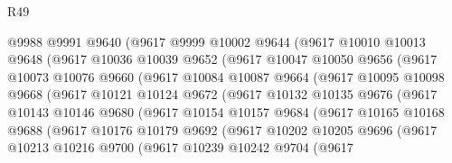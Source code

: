 \begin{lexlean}{R49}
\begin{coremodule}
                @9988
                @9991
                @9640
                (@9617
                  @9999
                  @10002
                  @9644
                  (@9617
                    @10010
                    @10013
                    @9648
                    (@9617
                      @10036
                      @10039
                      @9652
                      (@9617
                        @10047
                        @10050
                        @9656
                        (@9617
                          @10073
                          @10076
                          @9660
                          (@9617
                            @10084
                            @10087
                            @9664
                            (@9617
                              @10095
                              @10098
                              @9668
                              (@9617
                                @10121
                                @10124
                                @9672
                                (@9617
                                  @10132
                                  @10135
                                  @9676
                                  (@9617
                                    @10143
                                    @10146
                                    @9680
                                    (@9617
                                      @10154
                                      @10157
                                      @9684
                                      (@9617
                                        @10165
                                        @10168
                                        @9688
                                        (@9617
                                          @10176
                                          @10179
                                          @9692
                                          (@9617
                                            @10202
                                            @10205
                                            @9696
                                            (@9617
                                              @10213
                                              @10216
                                              @9700
                                              (@9617
                                                @10239
                                                @10242
                                                @9704
                                                (@9617

\end{coremodule}
\end{lexlean}
